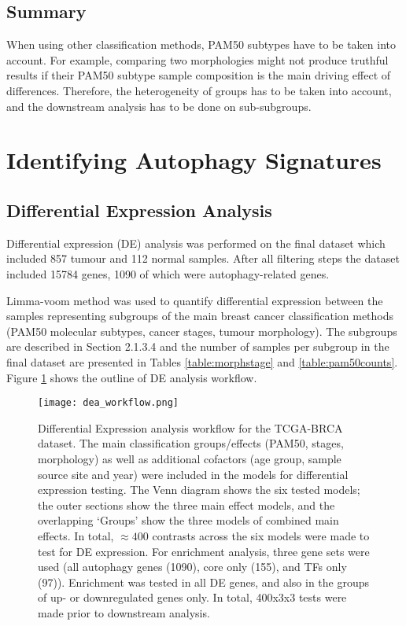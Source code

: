    
    
    \subsection{Summary}
    
    When using other classification methods, PAM50 subtypes have to be taken into account. For example, comparing two morphologies might not produce truthful results if their PAM50 subtype sample composition is the main driving effect of differences. Therefore, the heterogeneity of groups has to be taken into account, and the downstream analysis has to be done on sub-subgroups. 
    
\newpage
\section{Identifying Autophagy Signatures}

    \subsection{Differential Expression Analysis}
    
    Differential expression (DE) analysis was performed on the final dataset which included 857 tumour and 112 normal samples. After all filtering steps the dataset included 15784 genes, 1090 of which were autophagy-related genes. 

    Limma-voom method was used to quantify differential expression between the samples representing subgroups of the main breast cancer classification methods (PAM50 molecular subtypes, cancer stages, tumour morphology). The subgroups are described in Section 2.1.3.4 and the number of samples per subgroup in the final dataset are presented in Tables \ref{table:morphstage} and \ref{table:pam50counts}. Figure \ref{fig:deaworkflow} shows the outline of DE analysis workflow. 

       
            \begin{figure}[!h]
            \centering
            \texttt{[image: dea\_workflow.png]} 
            \caption[Differential Expression Analysis workflow]{Differential Expression analysis workflow for the TCGA-BRCA dataset. The main classification groups/effects (PAM50, stages, morphology) as well as additional cofactors (age group, sample source site and year) were included in the models for differential expression testing. The Venn diagram shows the six tested models; the outer sections show the three main effect models, and the overlapping ‘Groups' show the three models of combined main effects. In total, $\approx 400$ contrasts across the six models were made to test for DE expression. For enrichment analysis, three gene sets were used (all autophagy genes (1090), core only (155), and TFs only (97)). Enrichment was tested in all DE genes, and also in the groups of up- or downregulated genes only. In total, 400x3x3 tests were made prior to downstream analysis.  }
            \label{fig:deaworkflow}
            \end{figure}

